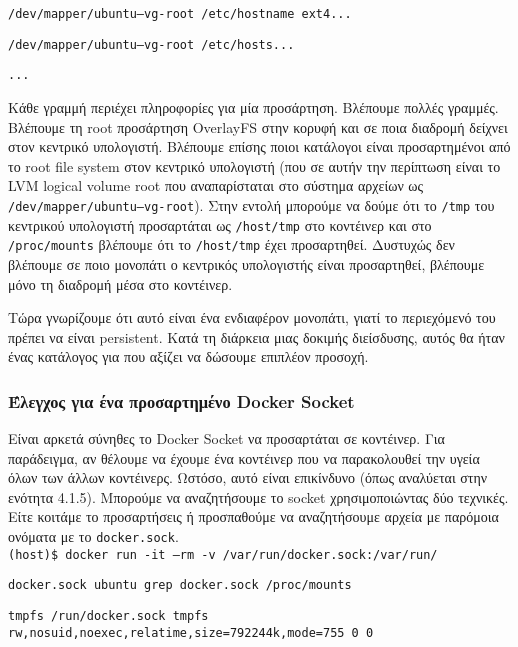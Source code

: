\texttt{\textlatin{/dev/mapper/ubuntu--vg-root /etc/hostname ext4...}}

\texttt{\textlatin{/dev/mapper/ubuntu--vg-root /etc/hosts...}}

\texttt{\textlatin{...}}



Κάθε γραμμή περιέχει πληροφορίες για μία προσάρτηση. Βλέπουμε πολλές γραμμές.
Βλέπουμε τη \textlatin{root} προσάρτηση \textlatin{OverlayFS} στην κορυφή και σε
ποια διαδρομή δείχνει στον κεντρικό υπολογιστή. Βλέπουμε επίσης ποιοι κατάλογοι
είναι προσαρτημένοι από το \textlatin{root file system} στον κεντρικό υπολογιστή
(που σε αυτήν την περίπτωση είναι το \textlatin{LVM logical volume root} που
αναπαρίσταται στο σύστημα αρχείων ως
\texttt{\textlatin{/dev/mapper/ubuntu--vg-root}}). Στην εντολή μπορούμε να δούμε
ότι το \texttt{\textlatin{/tmp}} του κεντρικού υπολογιστή προσαρτάται ως
\texttt{\textlatin{/host/tmp}} στο κοντέινερ και στο
\texttt{\textlatin{/proc/mounts}} βλέπουμε ότι το \texttt{\textlatin{/host/tmp}}
έχει προσαρτηθεί. Δυστυχώς δεν βλέπουμε σε ποιο μονοπάτι ο κεντρικός υπολογιστής
είναι προσαρτηθεί, βλέπουμε μόνο τη διαδρομή μέσα στο κοντέινερ.

Τώρα γνωρίζουμε ότι αυτό είναι ένα ενδιαφέρον μονοπάτι, γιατί το περιεχόμενό του
πρέπει να είναι \textlatin{persistent}. Κατά τη διάρκεια μιας δοκιμής
διείσδυσης, αυτός θα ήταν ένας κατάλογος για που αξίζει να δώσουμε επιπλέον
προσοχή.


\subsubsection{Έλεγχος για ένα προσαρτημένο \textlatin{Docker Socket}}


Είναι αρκετά σύνηθες το \textlatin{Docker Socket} να προσαρτάται σε κοντέινερ.
Για παράδειγμα, αν θέλουμε να έχουμε ένα κοντέινερ που να παρακολουθεί την υγεία
όλων των άλλων κοντέινερς. Ωστόσο, αυτό είναι επικίνδυνο (όπως αναλύεται στην
ενότητα 4.1.5). Μπορούμε να αναζητήσουμε το \textlatin{socket} χρησιμοποιώντας
δύο τεχνικές. Είτε κοιτάμε το προσαρτήσεις ή προσπαθούμε να αναζητήσουμε αρχεία
με παρόμοια ονόματα με το \texttt{\textlatin{docker.sock}}. \\

\texttt{\textlatin{(host)\$ docker run -it --rm -v /var/run/docker.sock:/var/run/}}

\texttt{\textlatin{docker.sock ubuntu grep docker.sock /proc/mounts}}

\texttt{\textlatin{tmpfs /run/docker.sock tmpfs rw,nosuid,noexec,relatime,size=792244k,mode=755 0 0}} \\

